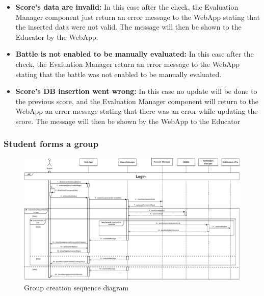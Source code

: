 \documentclass{article}
\begin{document}
{\begin{itemize}
            \item \textbf{Score's data are invalid:} In this case after the check, 
            the Evaluation Manager component just return an error message to the 
            WebApp stating that the inserted data were not valid. The message will 
            then be shown to the Educator by the WebApp.
            \item \textbf{Battle is not enabled to be manually evaluated:} In this case after 
            the check, the Evaluation Manager return an error message to the WebApp
            stating that the battle was not enabled to be manually evaluated.
            \item \textbf{Score's DB insertion went wrong:} In this case no update will
            be done to the previous score, and the Evaluation Manager component 
            will return to the WebApp an error message stating that there was an 
            error while updating the score. The message will then be shown by the 
            WebApp to the Educator
        \end{itemize}


    \subsubsection{Student forms a group}
        \begin{figure}[H]
            \centering
            \hspace*{-3.1cm}\includegraphics[scale=0.6]{Sequence/Sequence9DD.pdf}
            \caption{Group creation sequence diagram}
            \label{fig:Sequence9DD}
        \end{figure}

}
\end{document}
